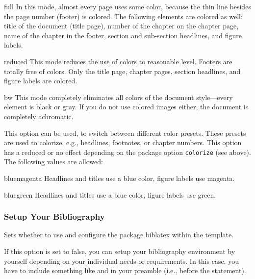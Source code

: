 \documentclass{ltxdockit}
\begin{document}
\begin{optionlist}
\begin{valuelist}
\item[full] In this mode, almost every page uses some color, because the thin line besides the page number (footer) is colored.
	The following elements are colored as well: title of the document (title page), number of the chapter on the chapter page, name of the chapter in the footer, section and sub-section headlines, and figure labels.
\item[reduced] This mode reduces the use of colors to reasonable level.
	Footers are totally free of colors.
	Only the title page, chapter pages, section headlines, and figure labels are colored.
\item[bw] This mode completely eliminates all colors of the document style---every element is black or gray.
	If you do not use colored images either, the document is completely achromatic.
\end{valuelist}


This option can be used, to switch between different color presets.
These presets are used to colorize, e.g., headlines, footnotes, or chapter numbers.
This option has a reduced or no effect depending on the package option \texttt{colorize} (see above).
The following values are allowed:

\begin{valuelist}
\item[bluemagenta] Headlines and titles use a blue color, figure labels use magenta.
\item[bluegreen] Headlines and titles use a blue color, figure labels use green.
\end{valuelist}


\subsubsection{Setup Your Bibliography}


Sets whether to use and configure the package biblatex within the template.

If this option is set to false, you can setup your bibliography environment by yourself depending on your individual needs or requirements. In this case, you have to include something like  and  in your preamble (i.e., before the  statement).


\end{optionlist}
\end{document}
